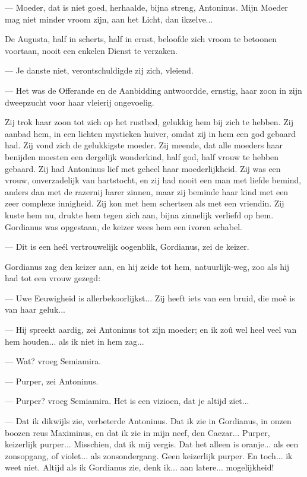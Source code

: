 \documentclass[a4paper, 12pt, oneside, dutch]{article}
\begin{document}
--- Moeder, dat is niet goed, herhaalde, bijna streng, Antoninus. Mijn Moeder mag niet minder vroom zijn, aan het Licht, dan ikzelve...

De Augusta, half in scherts, half in ernst, beloofde zich vroom te betoonen voortaan, nooit een enkelen Dienst te verzaken.

--- Je danste niet, verontschuldigde zij zich, vleiend.

--- Het was de Offerande en de Aanbidding antwoordde, ernstig, haar zoon in zijn dweepzucht voor haar vleierij ongevoelig.

Zij trok haar zoon tot zich op het rustbed, gelukkig hem bij zich te hebben. Zij aanbad hem, in een lichten mystieken huiver, omdat zij in hem een god gebaard had. Zij vond zich de gelukkigste moeder. Zij meende, dat alle moeders haar benijden moesten een dergelijk wonderkind, half god, half vrouw te hebben gebaard. Zij had Antoninus lief met geheel haar moederlijkheid. Zij was een vrouw, onverzadelijk van hartstocht, en zij had nooit een man met liefde bemind, anders dan met de razernij harer zinnen, maar zij beminde haar kind met een zeer complexe innigheid. Zij kon met hem schertsen als met een vriendin. Zij kuste hem nu, drukte hem tegen zich aan, bijna zinnelijk verliefd op hem. Gordianus was opgestaan, de keizer wees hem een ivoren schabel.

--- Dit is een heél vertrouwelijk oogenblik, Gordianus, zei de keizer.

Gordianus zag den keizer aan, en hij zeide tot hem, natuurlijk-weg, zoo als hij had tot een vrouw gezegd:

--- Uwe Eeuwigheid is allerbekoorlijkst... Zij heeft iets van een bruid, die moê is van haar geluk...

--- Hij spreekt aardig, zei Antoninus tot zijn moeder; en ik zoû wel heel veel van hem houden... als ik niet in hem zag...

--- Wat? vroeg Semiamira.

--- Purper, zei Antoninus.

--- Purper? vroeg Semiamira. Het is een vizioen, dat je altijd ziet...

--- Dat ik dikwijls zie, verbeterde Antoninus. Dat ik zie in Gordianus, in onzen boozen reus Maximinus, en dat ik zie in mijn neef, den Caezar... Purper, keizerlijk purper... Misschien, dat ik mij vergis. Dat het alleen is oranje... als een zonsopgang, of violet... als zonsondergang. Geen keizerlijk purper. En toch... ik weet niet. Altijd als ik Gordianus zie, denk ik... aan latere... mogelijkheid!
\end{document}
